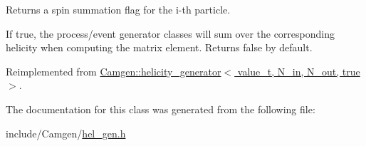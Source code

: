 Returns a spin summation flag for the i-\/th particle. 

If true, the process/event generator classes will sum over the corresponding helicity when computing the matrix element. Returns false by default. 

Reimplemented from \hyperlink{a00272_a5f9ad2e7ec5147c174578f659434cefa}{Camgen\+::helicity\+\_\+generator$<$ value\+\_\+t, N\+\_\+in, N\+\_\+out, true $>$}.



The documentation for this class was generated from the following file\+:\begin{DoxyCompactItemize}
\item 
include/\+Camgen/\hyperlink{a00659}{hel\+\_\+gen.\+h}\end{DoxyCompactItemize}
